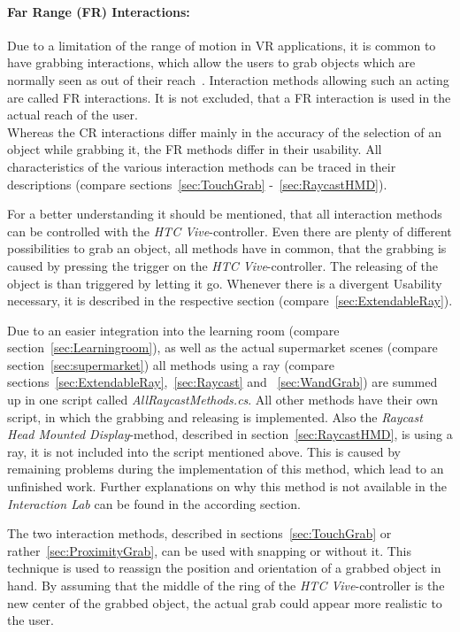 \paragraph{Far Range (FR) Interactions:} Due to a limitation of the range of motion in VR applications, it is common to have grabbing interactions, which allow the users to grab objects which are normally seen as out of their reach~\cite{VRBook}. Interaction methods allowing such an acting are called FR interactions. It is not excluded, that a FR interaction is used in the actual reach of the user. \\

Whereas the CR interactions differ mainly in the accuracy of the selection of an object while grabbing it, the FR methods differ in their usability. All characteristics of the various interaction methods can be traced in their descriptions (compare sections~\ref{sec:TouchGrab} -~\ref{sec:RaycastHMD}).

For a better understanding it should be mentioned, that all interaction methods can be controlled with the \textit{HTC Vive}-controller. Even there are plenty of different possibilities to grab an object, all methods have in common, that the grabbing is caused by pressing the trigger on the \textit{HTC Vive}-controller. The releasing of the object is than triggered by letting it go. Whenever there is a divergent Usability necessary, it is described in the respective section (compare~\ref{sec:ExtendableRay}).

Due to an easier integration into the learning room (compare section~\ref{sec:Learningroom}), as well as the actual supermarket scenes (compare section~\ref{sec:supermarket}) all methods using a ray (compare sections~\ref{sec:ExtendableRay},~\ref{sec:Raycast} and ~\ref{sec:WandGrab}) are summed up in one script called \textit{AllRaycastMethods.cs}. All other methods have their own script, in which the grabbing and releasing is implemented. Also the \textit{Raycast Head Mounted Display}-method, described in section~\ref{sec:RaycastHMD}, is using a ray, it is not included into the script mentioned above. This is caused by remaining problems during the implementation of this method, which lead to an unfinished work. Further explanations on why this method is not available in the \textit{Interaction Lab} can be found in the according section.

The two interaction methods, described in sections~\ref{sec:TouchGrab} or rather~\ref{sec:ProximityGrab}, can be used with snapping or without it. This technique is used to reassign the position and orientation of a grabbed object in hand. By assuming that the middle of the ring of the \textit{HTC Vive}-controller is the new center of the grabbed object, the actual grab could appear more realistic to the user. 

